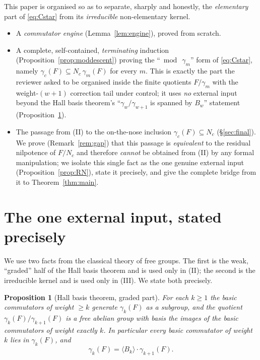 \documentclass{amsart}
\newtheorem{proposition}{Proposition}
\theoremstyle{definition}
\theoremstyle{remark}
\begin{document}
This paper is organised so as to separate, sharply and honestly, the
\emph{elementary} part of \eqref{eq:Cstar} from its \emph{irreducible}
non-elementary kernel.

\begin{itemize}
\item[(I)] A \emph{commutator engine} (Lemma~\ref{lem:engine}), proved from
scratch.
\item[(II)] A complete, self-contained, \emph{terminating} induction
(Proposition~\ref{prop:moddescent}) proving the ``$\bmod\ \gamma_m$'' form of
\eqref{eq:Cstar}, namely $\gamma_c(F)\subseteq N_c\,\gamma_m(F)$ for every $m$.
This is exactly the part the reviewer asked to be organised inside the finite
quotients $F/\gamma_m$ with the weight-$(w{+}1)$ correction tail under control;
it uses \emph{no} external input beyond the Hall basis theorem's
``$\gamma_w/\gamma_{w+1}$ is spanned by $B_w$'' statement
(Proposition~\ref{prop:hall}).
\item[(III)] The passage from (II) to the on-the-nose inclusion
$\gamma_c(F)\subseteq N_c$ (\S\ref{sec:final}). We prove
(Remark~\ref{rem:gap}) that this passage is \emph{equivalent} to the residual
nilpotence of $F/N_c$ and therefore \emph{cannot} be obtained from (II) by any
formal manipulation; we isolate this single fact as the one genuine external
input (Proposition~\ref{prop:RN}), state it precisely, and give the complete
bridge from it to Theorem~\ref{thm:main}.
\end{itemize}

\section{The one external input, stated precisely}\label{sec:input}

We use two facts from the classical theory of free groups. The first is the
weak, ``graded'' half of the Hall basis theorem and is used only in (II); the
second is the irreducible kernel and is used only in (III). We state both
precisely.

\begin{proposition}[Hall basis theorem, graded part]\label{prop:hall}
For each $k\ge 1$ the basic commutators of weight $\ge k$ generate $\gamma_k(F)$
as a subgroup, and the quotient $\gamma_k(F)/\gamma_{k+1}(F)$ is a free abelian
group with basis the images of the basic commutators of weight exactly $k$. In
particular every basic commutator of weight $k$ lies in $\gamma_k(F)$, and
\begin{equation}\label{eq:hall-decomp}
\gamma_k(F)=\langle B_k\rangle\cdot\gamma_{k+1}(F).
\end{equation}
\end{proposition}
\end{document}
